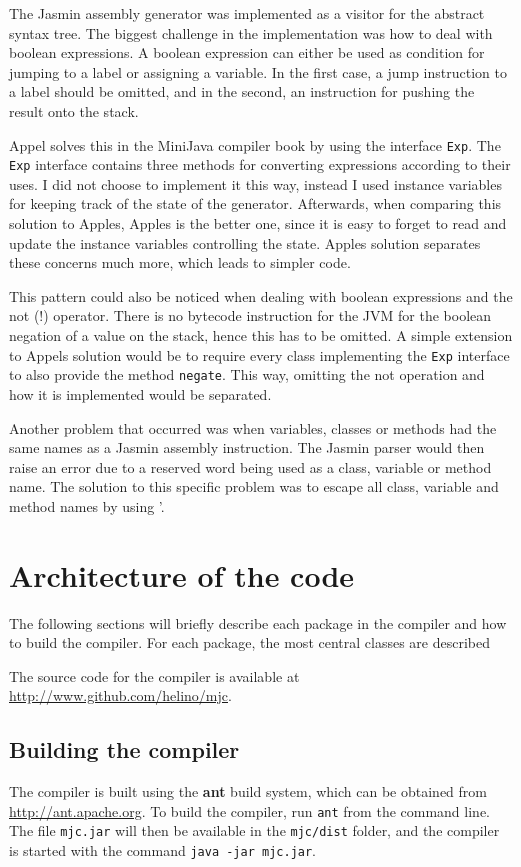 \documentclass[11pt,oneside,a4paper]{article}
\newcommand{\code}[1]{\texttt{#1}}
\newcommand{\file}[1]{\texttt{#1}}
\newcommand{\folder}[1]{\texttt{#1}}
\newcommand{\command}[1]{\texttt{#1}}
\begin{document}
The Jasmin assembly generator was implemented as a visitor for the abstract
syntax tree. The biggest challenge in the implementation was how to deal with
boolean expressions. A boolean expression can either be used as condition for
jumping to a label or assigning a variable. In the first case, a jump
instruction to a label should be omitted, and in the second, an instruction for
pushing the result onto the stack.

Appel solves this in the MiniJava compiler book by using the interface
\code{Exp}. The \code{Exp} interface contains three methods for converting
expressions according to their uses. 
I did not choose to implement it this way, instead I used instance variables
for keeping track of the state of the generator. Afterwards, when comparing this
solution to Apples, Apples is the better one, since it is easy to forget to
read and update the instance variables controlling the state. Apples solution
separates these concerns much more, which leads to simpler code.

This pattern could also be noticed when dealing with boolean expressions and
the not (!) operator. There is no bytecode instruction for the JVM for the
boolean negation of a value on the stack,
hence this has to be omitted. A simple extension to Appels
solution would be to require every class implementing the \code{Exp}
interface to also provide the method \code{negate}. This way, omitting the
not operation and how it is implemented would be separated.

Another problem that occurred was when variables, classes or methods had the
same names as a Jasmin assembly instruction. The Jasmin parser would then
raise an error due to a reserved word being used as a class, variable or 
method name. The solution to this specific problem was to escape all class, 
variable and method names by using '.

\section{Architecture of the code}
The following sections will briefly describe each package in the compiler and
how to build the compiler. For each package, the most central classes are
described

The source code for the compiler is available at 
\href{http://www.github.com/helino/mjc}{http://www.github.com/helino/mjc}.

\subsection{Building the compiler}
The compiler is built using the \textbf{ant} build system, which can be 
obtained from \href{http://ant.apache.org}{http://ant.apache.org}. 
To build the compiler, run \command{ant} from the command line. 
The file \file{mjc.jar} will then be available in the
\folder{mjc/dist} folder, and the compiler is started with the command 
\command{java -jar mjc.jar}.
\end{document}
